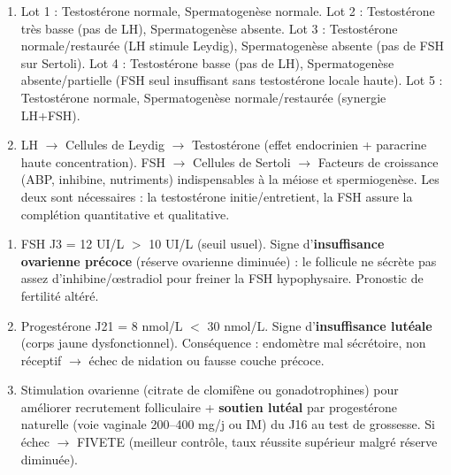 \documentclass[11pt]{article}
\begin{document}
\begin{corrige}[Exercice 1]
\begin{enumerate}
\item Lot 1 : Testostérone normale, Spermatogenèse normale. Lot 2 : Testostérone très basse (pas de LH), Spermatogenèse absente. Lot 3 : Testostérone normale/restaurée (LH stimule Leydig), Spermatogenèse absente (pas de FSH sur Sertoli). Lot 4 : Testostérone basse (pas de LH), Spermatogenèse absente/partielle (FSH seul insuffisant sans testostérone locale haute). Lot 5 : Testostérone normale, Spermatogenèse normale/restaurée (synergie LH+FSH).
\item LH $\rightarrow$ Cellules de Leydig $\rightarrow$ Testostérone (effet endocrinien + paracrine haute concentration). FSH $\rightarrow$ Cellules de Sertoli $\rightarrow$ Facteurs de croissance (ABP, inhibine, nutriments) indispensables à la méiose et spermiogenèse. Les deux sont nécessaires : la testostérone initie/entretient, la FSH assure la complétion quantitative et qualitative.
\end{enumerate}
\end{corrige}

\begin{corrige}[Exercice 2]
\begin{enumerate}
\item FSH J3 = 12 UI/L $>$ 10 UI/L (seuil usuel). Signe d'\textbf{insuffisance ovarienne précoce} (réserve ovarienne diminuée) : le follicule ne sécrète pas assez d'inhibine/\oe{}stradiol pour freiner la FSH hypophysaire. Pronostic de fertilité altéré.
\item Progestérone J21 = 8 nmol/L $<$ 30 nmol/L. Signe d'\textbf{insuffisance lutéale} (corps jaune dysfonctionnel). Conséquence : endomètre mal sécrétoire, non réceptif $\rightarrow$ échec de nidation ou fausse couche précoce.
\item Stimulation ovarienne (citrate de clomifène ou gonadotrophines) pour améliorer recrutement folliculaire + \textbf{soutien lutéal} par progestérone naturelle (voie vaginale 200--400 mg/j ou IM) du J16 au test de grossesse. Si échec $\rightarrow$ FIVETE (meilleur contrôle, taux réussite supérieur malgré réserve diminuée).
\end{enumerate}
\end{corrige}
\end{document}
